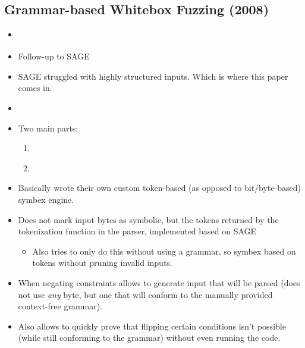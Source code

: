 \documentclass{article}
\begin{document}
\subsection{Grammar-based Whitebox Fuzzing (2008)}
\begin{itemize}
    \item \cite{GrammarBasedWhiteboxFuzzing}
    \item Follow-up to SAGE\cite{SAGE}
    \item SAGE struggled with highly structured inputs. Which is where this paper comes in.
    \item {}\cite{GrammarBasedWhiteboxFuzzing}
    \item Two main parts:
          \begin{enumerate}
              \item {}\cite{GrammarBasedWhiteboxFuzzing}
              \item {}\cite{GrammarBasedWhiteboxFuzzing}
          \end{enumerate}
    \item Basically wrote their own custom token-based (as opposed to bit/byte-based) symbex engine.
    \item Does not mark input bytes as symbolic, but the tokens returned by the tokenization function in the parser, implemented based on SAGE\cite{SAGE}
          \begin{itemize}
              \item Also tries to only do this without using a grammar, so symbex based on tokens without pruning invalid inputs.
          \end{itemize}
    \item When negating constraints allows to generate input that will be parsed (does not use \textit{any} byte, but one that will conform to the manually provided context-free grammar).
    \item Also allows to quickly prove that flipping certain conditions isn't possible (while still conforming to the grammar) without even running the code.

\end{itemize}
\end{document}
